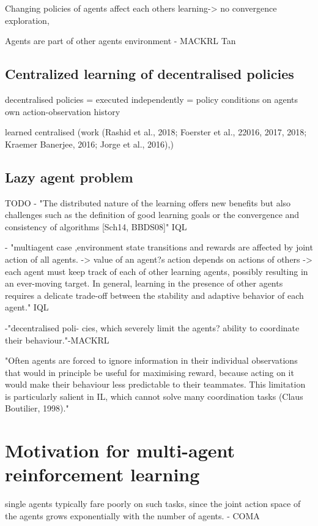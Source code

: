 Changing policies of agents affect each others learning-> no convergence
exploration, 

Agents are part of other agents environment - MACKRL Tan

\subsection{Centralized learning of decentralised policies}

decentralised policies = executed independently = policy conditions on agents own action-observation history

learned centralised (work (Rashid et al., 2018; Foerster et al.,
22016, 2017, 2018; Kraemer Banerjee, 2016; Jorge et al., 2016),)

\subsection{Lazy agent problem}
 TODO
- "The distributed nature of the learning offers new benefits but also challenges such
as the definition of good learning goals or the convergence and consistency of algorithms [Sch14, BBDS08]" IQL

- "multiagent case ,environment state transitions and rewards are
affected by  joint action of all agents. -> value of an agent?s action depends on actions of others -> each agent must keep track of each of other learning agents, possibly resulting in an ever-moving target. In general, learning in the presence of other agents
requires a delicate trade-off between the stability and adaptive behavior of each agent." IQL

-"decentralised poli-
cies, which severely limit the agents? ability to coordinate their behaviour."-MACKRL

"Often agents are forced to ignore information in their individual observations that
would in principle be useful for maximising reward, because acting on it would make their behaviour
less predictable to their teammates. This limitation is particularly salient in IL, which cannot solve
many coordination tasks (Claus Boutilier, 1998)."
%
%
%
\section{Motivation for multi-agent reinforcement learning}

single agents typically fare
poorly on such tasks, since the joint action space of the
agents grows exponentially with the number of agents. - COMA
%
%
%
